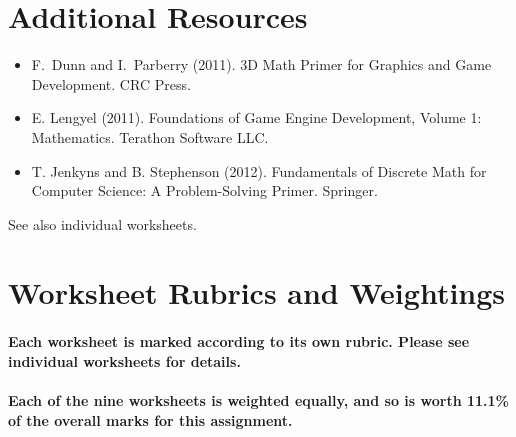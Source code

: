 \documentclass{../../fal_assignment}
\begin{document}
\section*{Additional Resources}

\begin{itemize}
    \item F.\ Dunn and I.\ Parberry (2011). 3D Math Primer for Graphics and Game Development. CRC Press.
    \item E. Lengyel (2011). Foundations of Game Engine Development, Volume 1: Mathematics. Terathon Software LLC.
    \item T. Jenkyns and B. Stephenson (2012). Fundamentals of Discrete Math for Computer Science: A Problem-Solving Primer. Springer.
\end{itemize}

See also individual worksheets.

\section*{Worksheet Rubrics and Weightings}

\paragraph{Each worksheet is marked according to its own rubric. Please see individual worksheets for details.}

\paragraph{Each of the nine worksheets is \textbf{weighted equally}, and so is worth 11.1\% of the overall marks for this assignment.}


\end{document}
